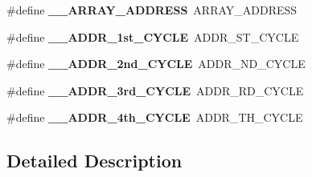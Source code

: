 \begin{DoxyCompactItemize}
\#define {\bfseries \+\_\+\+\_\+\+A\+R\+R\+A\+Y\+\_\+\+A\+D\+D\+R\+E\+SS}~A\+R\+R\+A\+Y\+\_\+\+A\+D\+D\+R\+E\+SS
\item 
\mbox{\label{group___h_a_l___n_a_n_d___aliased___defines_ga1e95b9f6b605085f2b0ad95794841a7b}} 
\#define {\bfseries \+\_\+\+\_\+\+A\+D\+D\+R\+\_\+1st\+\_\+\+C\+Y\+C\+LE}~A\+D\+D\+R\+\_\+S\+T\+\_\+\+C\+Y\+C\+LE
\item 
\mbox{\label{group___h_a_l___n_a_n_d___aliased___defines_gaa1477fe89e780f7da3e780d29a97a9b1}} 
\#define {\bfseries \+\_\+\+\_\+\+A\+D\+D\+R\+\_\+2nd\+\_\+\+C\+Y\+C\+LE}~A\+D\+D\+R\+\_\+N\+D\+\_\+\+C\+Y\+C\+LE
\item 
\mbox{\label{group___h_a_l___n_a_n_d___aliased___defines_ga4316e40c7905baa397537633d191fa31}} 
\#define {\bfseries \+\_\+\+\_\+\+A\+D\+D\+R\+\_\+3rd\+\_\+\+C\+Y\+C\+LE}~A\+D\+D\+R\+\_\+R\+D\+\_\+\+C\+Y\+C\+LE
\item 
\mbox{\label{group___h_a_l___n_a_n_d___aliased___defines_ga012bb903469430b21f4bbca8ce3c7654}} 
\#define {\bfseries \+\_\+\+\_\+\+A\+D\+D\+R\+\_\+4th\+\_\+\+C\+Y\+C\+LE}~A\+D\+D\+R\+\_\+T\+H\+\_\+\+C\+Y\+C\+LE
\end{DoxyCompactItemize}


\subsection{Detailed Description}
